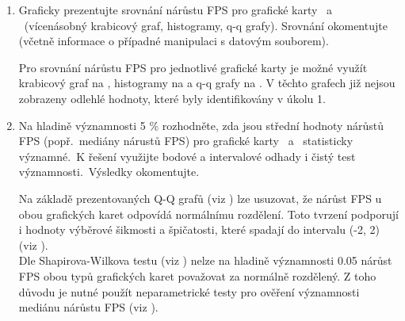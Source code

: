 \begin{enumerate}[label=\alph*)]
    \item Graficky prezentujte srovnání nárůstu FPS pro grafické karty \nvidiaCardTri\ a \amdCardSedm\ (vícenásobný krabicový graf, histogramy, q-q grafy).
    Srovnání okomentujte (včetně informace o případné manipulaci s datovým souborem).

    \vspace{1em}
    \begin{minipage}{0.94\textwidth}
        Pro srovnání nárůstu FPS pro jednotlivé grafické karty je možné využít krabicový graf na , histogramy na  a q-q grafy na .
        V těchto grafech již nejsou zobrazeny odlehlé hodnoty, které byly identifikovány v úkolu 1.
    \end{minipage}

    \newpage
    \item Na hladině významnosti 5 \% rozhodněte, zda jsou střední hodnoty nárůstů FPS (popř.\ mediány nárustů FPS) pro grafické karty \nvidiaCardTri\ a
    \amdCardSedm\ statisticky významné.\ K řešení využijte bodové a intervalové odhady i čistý test významnosti.\ Výsledky okomentujte.

    \vspace{1em}
    \begin{minipage}{0.94\textwidth}
        Na základě prezentovaných Q-Q grafů (viz ) lze usuzovat, že nárůst FPS u obou grafických karet odpovídá normálnímu rozdělení.
        Toto tvrzení podporují i hodnoty výběrové šikmosti a špičatosti, které spadají do intervalu (-2, 2) (viz ). \\

        Dle Shapirova-Wilkova testu (viz ) nelze na hladině významnosti 0.05 nárůst FPS obou typů grafických karet považovat za normálně rozdělený.
        Z toho důvodu je nutné použít neparametrické testy pro ověření významnosti mediánu nárůstu FPS (viz ).

        \label{tab:normality-test}
        \renewcommand{\arraystretch}{1.3}
        \vspace{1em}


\end{minipage}
\end{enumerate}
